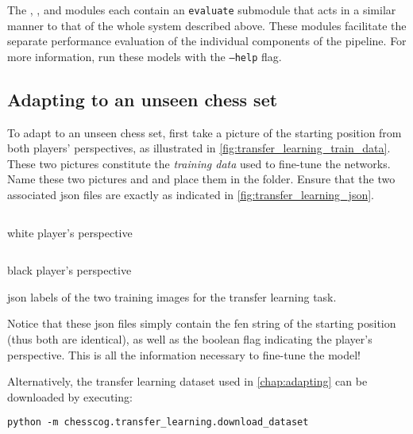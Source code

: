 \documentclass[../../report.tex]{subfiles}
\begin{document}
The , , and  modules each contain an \texttt{evaluate} submodule that acts in a similar manner to that of the whole system described above.
These modules facilitate the separate performance evaluation of the individual components of the pipeline.
For more information, run these models with the \texttt{--help} flag.

\subsection{Adapting to an unseen chess set}
To adapt to an unseen chess set, first take a picture of the starting position from both players' perspectives, as illustrated in \cref{fig:transfer_learning_train_data}.
These two pictures constitute the \emph{training data} used to fine-tune the networks.
Name these two pictures  and  and place them in the  folder.
Ensure that the two associated \gls{json} files are exactly as indicated in \cref{fig:transfer_learning_json}.
\begin{listing}
    \begin{sublisting}[b]{\textwidth}
        \inputminted{json}{\subfix{../../data/transfer_learning/white.json}}
        \caption{white player's perspective}
    \end{sublisting}
    \medskip\par
    \begin{sublisting}[b]{\textwidth}
        \inputminted{json}{\subfix{../../data/transfer_learning/black.json}}
        \caption{black player's perspective}
    \end{sublisting}
    \caption{\Acs{json} labels of the two training images for the transfer learning task.}
    \label{fig:transfer_learning_json}
\end{listing}
Notice that these \gls{json} files simply contain the \gls{fen} string of the starting position (thus both are identical), as well as the boolean flag indicating the player's perspective.
This is all the information necessary to fine-tune the model!

Alternatively, the transfer learning dataset used in \cref{chap:adapting} can be downloaded by executing:
\begin{verbatim}
python -m chesscog.transfer_learning.download_dataset
\end{verbatim}
\end{document}
